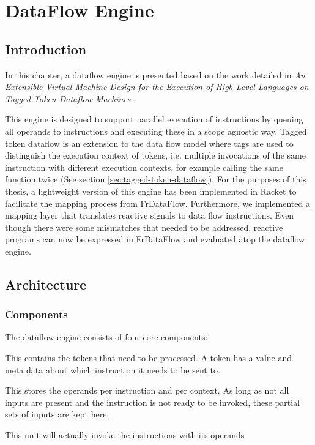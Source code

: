 \chapter{DataFlow Engine}

\section{Introduction}

In this chapter, a dataflow engine is presented based on the work detailed in \textit{An Extensible Virtual Machine Design for the Execution of High-Level Languages on Tagged-Token Dataflow Machines} \cite{saey_extensible_2017}.
	
This engine is designed to support parallel execution of instructions by queuing all operands to instructions and executing these in a scope agnostic way.
Tagged token dataflow is an extension to the data flow model where tags are used to distinguish the execution context of tokens, i.e. multiple invocations of the same instruction with different execution contexts, for example calling the same function twice (See section \ref{sec:tagged-token-dataflow}).
For the purposes of this thesis, a lightweight version of this engine has been implemented in Racket to facilitate the mapping process from FrDataFlow. Furthermore, we implemented a mapping layer that translates reactive signals to data flow instructions. Even though there were some mismatches that needed to be addressed, reactive programs can now be expressed in FrDataFlow and evaluated atop the dataflow engine. 

\newpage
\section{Architecture}

\subsection{Components}

The dataflow engine consists of four core components:

\begin{description}[style=nextline]
	\item[The token queue] This contains the tokens that need to be processed. A token has a value and meta data about which instruction it needs to be sent to. 
	\item[The matching memory] This stores the operands per instruction and per context. As long as not all inputs are present and the instruction is not ready to be invoked, these partial sets of inputs are kept here.
	\item[The execution unit] This unit will actually invoke the instructions with its operands
\end{description}

